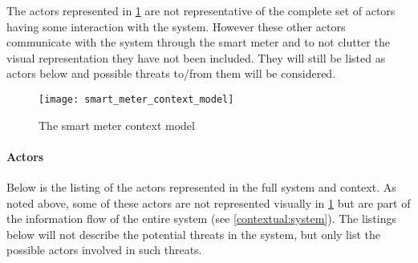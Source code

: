 The actors represented in \cref{contextual:sm_model} are not representative of the complete set of actors having some interaction with the system.
However these other actors communicate with the system through the smart meter and to not clutter the visual representation they have not been included.
They will still be listed as actors below and possible threats to/from them will be considered.

\begin{figure}[h]
  \centering
  \texttt{[image: smart\_meter\_context\_model]}
  \caption{The smart meter context model}
  \label{contextual:sm_model}
\end{figure}

\paragraph{Actors}\label{contextActors}
Below is the listing of the actors represented in the full system and context.
As noted above, some of these actors are not represented visually in \cref{contextual:sm_model} but are part of the information flow of the entire system (see \cref{contextual:system}).
The listings below will not describe the potential threats in the system, but only list the possible actors involved in such threats.
